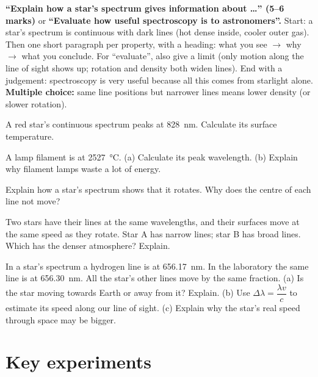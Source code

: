 \begin{examtip}
\textbf{``Explain how a star's spectrum gives information about \ldots'' (5--6 marks)} or
\textbf{``Evaluate how useful spectroscopy is to astronomers''.} Start: a star's spectrum is
continuous with dark lines (hot dense inside, cooler outer gas). Then one short paragraph per
property, with a heading: what you see $\to$ why $\to$ what you conclude. For ``evaluate'', also
give a limit (only motion along the line of sight shows up; rotation and density both widen
lines). End with a judgement: spectroscopy is very useful because all this comes from starlight
alone.\\[3pt]
\textbf{Multiple choice:} same line positions but narrower lines means lower density (or slower
rotation).
\end{examtip}

\begin{quickcheck}
  \item A red star's continuous spectrum peaks at \qty{828}{nm}. Calculate its surface
        temperature.
  \item A lamp filament is at \qty{2527}{\degreeCelsius}. (a) Calculate its peak wavelength.
        (b) Explain why filament lamps waste a lot of energy.
  \item Explain how a star's spectrum shows that it rotates. Why does the centre of each line
        not move?
  \item Two stars have their lines at the same wavelengths, and their surfaces move at the same
        speed as they rotate. Star A has narrow lines; star B has broad lines. Which has the
        denser atmosphere? Explain.
  \item In a star's spectrum a hydrogen line is at \qty{656.17}{nm}. In the laboratory the same
        line is at \qty{656.30}{nm}. All the star's other lines move by the same fraction.
        (a) Is the star moving towards Earth or away from it? Explain. (b) Use
        $\Delta\lambda = \dfrac{\lambda v}{c}$ to estimate its speed along our line of sight.
        (c) Explain why the star's real speed through space may be bigger.\label{ch1:qc:doppler}
\end{quickcheck}

\section{Key experiments}\label{ch1:sec:experiments}

